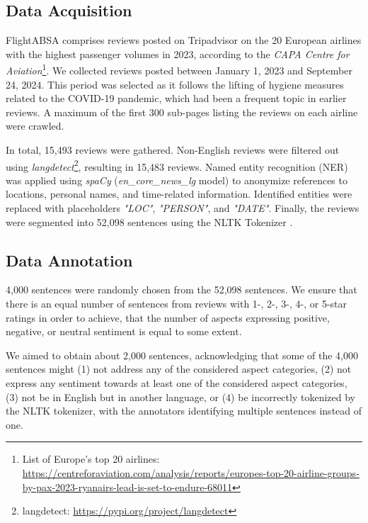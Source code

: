 \subsection{Data Acquisition}

FlightABSA comprises reviews posted on Tripadvisor on the 20 European airlines with the highest passenger volumes in 2023, according to the \textit{CAPA Centre for Aviation}\footnote{List of Europe's top 20 airlines: \url{https://centreforaviation.com/analysis/reports/europes-top-20-airline-groups-by-pax-2023-ryanairs-lead-is-set-to-endure-68011}}. We collected reviews posted between January 1, 2023 and September 24, 2024. This period was selected as it follows the lifting of hygiene measures related to the COVID-19 pandemic, which had been a frequent topic in earlier reviews. A maximum of the first 300 sub-pages listing the reviews on each airline were crawled.

In total, 15,493 reviews were gathered. Non-English reviews were filtered out using \textit{langdetect}\footnote{langdetect: \url{https://pypi.org/project/langdetect}}, resulting in 15,483 reviews. Named entity recognition (NER) was applied using \textit{spaCy} (\textit{en\_core\_news\_lg} model) \cite{honnibal2017spacy} to anonymize references to locations, personal names, and time-related information. Identified entities were replaced with placeholders \textit{"LOC"}, \textit{"PERSON"}, and \textit{"DATE"}. Finally, the reviews were segmented into 52,098 sentences using the NLTK Tokenizer \cite{loper2002nltk}. 

\subsection{Data Annotation}

4,000 sentences were randomly chosen from the 52,098 sentences. We ensure that there is an equal number of sentences from reviews with 1-, 2-, 3-, 4-, or 5-star ratings in order to achieve, that the number of aspects expressing positive, negative, or neutral sentiment is equal to some extent. 

We aimed to obtain about 2,000 sentences, acknowledging that some of the 4,000 sentences might (1) not address any of the considered aspect categories, (2) not express any sentiment towards at least one of the considered aspect categories, (3) not be in English but in another language, or (4) be incorrectly tokenized by the NLTK tokenizer, with the annotators identifying multiple sentences instead of one.

